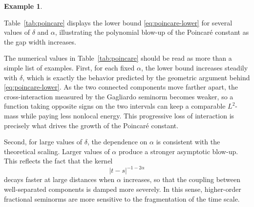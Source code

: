 \documentclass[11pt,a4paper]{article}
\numberwithin{equation}{section}
\theoremstyle{definition}
\newtheorem{example}[example]{Example}
\begin{document}
\begin{example}\label{ex:poincare-table}

Table~\ref{tab:poincare} displays the lower bound \eqref{eq:poincare-lower} for several values of
\(\delta\) and \(\alpha\), illustrating the polynomial blow-up of the
Poincar\'e constant as the gap width increases.

The numerical values in Table~\ref{tab:poincare} should be read as more than a simple list of examples. First, for each fixed \(\alpha\), the lower bound increases steadily with \(\delta\), which is exactly the behavior predicted by the geometric argument behind \eqref{eq:poincare-lower}. As the two connected components move farther apart, the cross-interaction measured by the Gagliardo seminorm becomes weaker, so a function taking opposite signs on the two intervals can keep a comparable \(L^2\)-mass while paying less nonlocal energy. This progressive loss of interaction is precisely what drives the growth of the Poincar\'e constant.

Second, for large values of \(\delta\), the dependence on \(\alpha\) is consistent with the theoretical scaling. Larger values of \(\alpha\) produce a stronger asymptotic blow-up. This reflects the fact that the kernel
\[
|t-s|^{-1-2\alpha}
\]
decays faster at large distances when \(\alpha\) increases, so that the coupling between well-separated components is damped more severely. In this sense, higher-order fractional seminorms are more sensitive to the fragmentation of the time scale.


\end{example}
\end{document}
